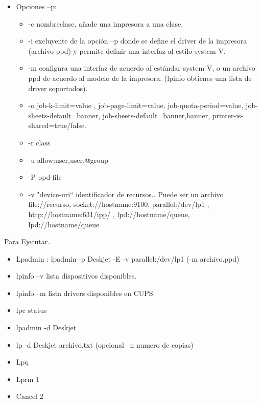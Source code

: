 \documentclass{beamer}
\begin{document}
\begin{frame}
	\begin{itemize}
		\item Opciones –p:
		\begin{itemize}
			\item -c nombreclase, añade una impresora a una clase.
			\item -i excluyente de la opción –p donde se define el driver de la impresora (archivo ppd) y permite definir una interfaz al estilo system V.
			\item -m configura una interfaz de acuerdo al estándar system V, o un archivo ppd de acuerdo al modelo de la impresora. (lpinfo obtienes una lista de driver soportados).
			\item -o job-k-limit=value , job-page-limit=value, job-quota-period=value, job-sheets-default=banner, job-sheets-default=banner,banner, printer-is-shared=true/false.
			\item  -r class
			\item  -u allow:user,user,@group
			\item -P ppd-file
			\item -v "device-uri“  identificador de recursos.. Puede ser un archivo file://recurso, socket://hostname:9100, parallel:/dev/lp1 , http://hostname:631/ipp/ , lpd://hostname/queue, lpd://hostname/queue
		\end{itemize}
	\end{itemize}
\end{frame}

\begin{frame}{Para Ejecutar..}
\begin{itemize}
	\item Lpadmin : lpadmin -p Deskjet -E -v parallel:/dev/lp1  (-m archivo.ppd)
	\item lpinfo –v lista dispositivos disponibles.
	\item lpinfo –m lista drivers disponibles en CUPS.
	\item lpc status
	\item lpadmin -d Deskjet
	\item lp -d Deskjet archivo.txt (opcional –n numero de copias)
	\item Lpq
	\item Lprm 1
	\item Cancel 2
\end{itemize}
\end{frame}
\end{document}
